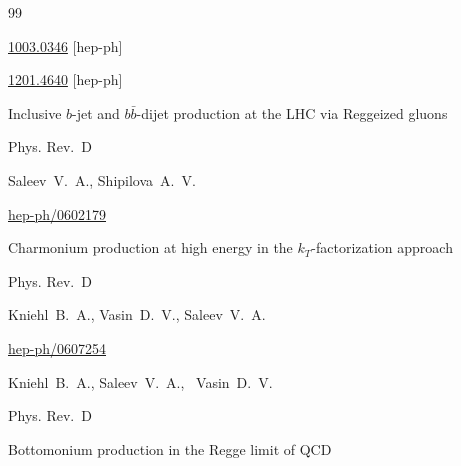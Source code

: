 \begin{thebibliography}{99}


\arxiv \href{http://arxiv.org/abs/1003.0346}{1003.0346} [hep-ph]




\arxiv \href{http://arxiv.org/abs/1201.4640}{1201.4640} [hep-ph]

\paper Inclusive $b$-jet and $b \bar b$-dijet production at the LHC via Reggeized gluons


\jour Phys. Rev.~D 



\by Saleev~V.~A., Shipilova~A.~V.





\arxiv \href{http://arxiv.org/abs/hep-ph/0602179}{hep-ph/0602179}

\paper Charmonium production at high energy in the $k_T$-factorization approach


\jour Phys. Rev.~D 



\by Kniehl~B.~A., Vasin~D.~V., Saleev~V.~A.










\arxiv \href{http://arxiv.org/abs/hep-ph/0607254}{hep-ph/0607254}

\by Kniehl~B.~A., Saleev~V.~A., ~Vasin~D.~V.

\jour Phys. Rev.~D 





\paper Bottomonium production in the Regge limit of QCD





\end{thebibliography}
